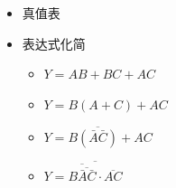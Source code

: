 \documentclass[UTF8]{ctexart}
\begin{document}
\begin{enumerate}
\begin{itemize}
\begin{itemize}
\begin{itemize}
                                  \item 真值表\\

                                        \vspace{1\baselineskip}
                                  \item 表达式化简\\
                                        \begin{itemize}
                                            \centering
                                            \Large
                                            \item $Y=AB+BC+AC$
                                            \item $Y=B(A+C)+AC$
                                            \item $Y=B\overline{(\bar{A}\bar{C})}+AC$
                                            \item $Y=\overline{\overline{B\overline{\bar{A} \bar{C}}}\cdot \overline{AC}}$
                                        \end{itemize}


\end{itemize}
\end{itemize}
\end{itemize}
\end{enumerate}
\end{document}
